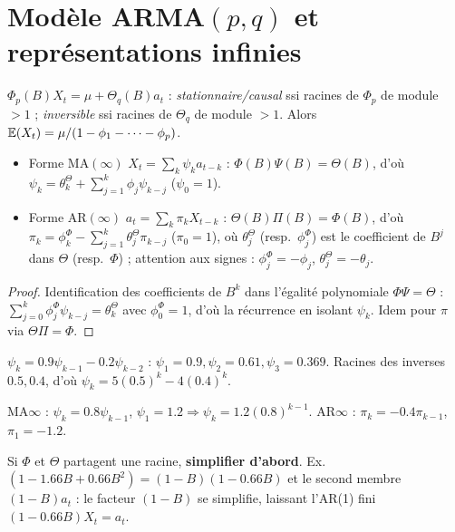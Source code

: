 \documentclass[11pt]{report}
\begin{document}
\section{Modèle ARMA$(p,q)$ et représentations infinies}
\begin{definition}
$\Phi_p(B)X_t=\mu+\Theta_q(B)a_t$ : \emph{stationnaire/causal} ssi racines de $\Phi_p$ de
module $>1$ ; \emph{inversible} ssi racines de $\Theta_q$ de module $>1$. Alors
$\mathbb{E}(X_t)=\mu/(1-\phi_1-\dots-\phi_p)$.
\end{definition}
\begin{theoreme}\label{th:repr}
\begin{itemize}[leftmargin=*,nosep]
\item Forme $\mathrm{MA}(\infty)$ $X_t=\sum_k\psi_ka_{t-k}$ : $\Phi(B)\Psi(B)=\Theta(B)$, d'où
$\psi_k=\theta^\Theta_k+\sum_{j=1}^k\phi_j\psi_{k-j}$ ($\psi_0=1$).
\item Forme $\mathrm{AR}(\infty)$ $a_t=\sum_k\pi_kX_{t-k}$ : $\Theta(B)\Pi(B)=\Phi(B)$, d'où
$\pi_k=\phi^\Phi_k-\sum_{j=1}^k\theta^\Theta_j\pi_{k-j}$ ($\pi_0=1$),
où $\theta^\Theta_j$ (resp.\ $\phi^\Phi_j$) est le coefficient de $B^j$ dans $\Theta$ (resp.\
$\Phi$) ; attention aux signes : $\phi^\Phi_j=-\phi_j$, $\theta^\Theta_j=-\theta_j$.
\end{itemize}
\end{theoreme}
\begin{proof}
Identification des coefficients de $B^k$ dans l'égalité polynomiale $\Phi\Psi=\Theta$ :
$\sum_{j=0}^k\phi^\Phi_j\psi_{k-j}=\theta^\Theta_k$ avec $\phi^\Phi_0=1$, d'où la récurrence
en isolant $\psi_k$. Idem pour $\pi$ via $\Theta\Pi=\Phi$.
\end{proof}
\begin{exemple}[AR(2) $X_t-0.9X_{t-1}+0.2X_{t-2}=a_t$ ; $\to$ Q\,C.1]
$\psi_k=0.9\psi_{k-1}-0.2\psi_{k-2}$ : $\psi_1=0.9,\psi_2=0.61,\psi_3=0.369$. Racines des
inverses $0.5,0.4$, d'où $\psi_k=5(0.5)^k-4(0.4)^k$.
\end{exemple}
\begin{exemple}[$(1-0.8B)X_t=(1+0.4B)a_t$ ; $\to$ Q\,C.3, B.5]
MA$\infty$ : $\psi_k=0.8\psi_{k-1}$, $\psi_1=1.2\Rightarrow\psi_k=1.2(0.8)^{k-1}$.
AR$\infty$ : $\pi_k=-0.4\pi_{k-1}$, $\pi_1=-1.2$.
\end{exemple}
\begin{attention}
Si $\Phi$ et $\Theta$ partagent une racine, \textbf{simplifier d'abord}. Ex.\
$(1-1.66B+0.66B^2)=(1-B)(1-0.66B)$ et le second membre $(1-B)a_t$ : le facteur $(1-B)$ se
simplifie, laissant l'AR(1) fini $(1-0.66B)X_t=a_t$.
\end{attention}
\end{document}
